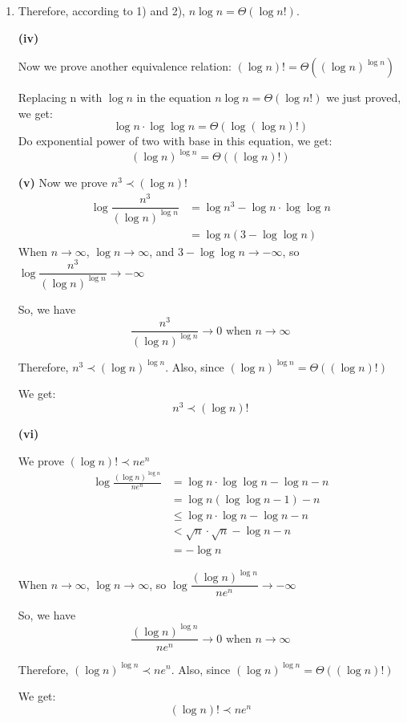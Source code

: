 \documentclass[12pt,a4paper]{article}
\makeatletter
\newtheorem*{solution}{Solution}
\theoremstyle{definition}
\renewenvironment{solution}[1][Solution] {\par\pushQED{\qed}\normalfont\topsep6\p@\@plus6\p@\relax\trivlist\item[\hskip\labelsep\bfseries#1\@addpunct{.}]\ignorespaces}{\popQED\endtrivlist\@endpefalse} \makeatother
\makeatother
\begin{document}
\begin{enumerate}
\begin{solution}
Therefore, according to 1) and 2), $n\log n = \Theta{(\log n!)}$.


\textbf{(iv)}

Now we prove another equivalence relation: $(\log n)  != \Theta((\log n)^{\log n})$

Replacing n with $\log n $ in the equation $n\log n = \Theta{(\log n!)}$ we just proved, we get:
$$
\log n \cdot \log \log n  = \Theta{(\log (\log n )!)}
$$
Do 	exponential power of two with base in this equation, we get:
$$
(\log n)^{\log n} = \Theta((\log n)! )
$$ 

\textbf{(v)}
Now we prove $n^3 \prec (\log n)!$
\begin{align*}
	\log\dfrac{n^3}{(\log n)^{\log n}} &= \log n^3  - \log n \cdot \log\log n\\
	&= \log n (3 - \log \log n)
\end{align*}
When $n \rightarrow \infty$, $\log n \rightarrow \infty$, and $3 - \log \log n \rightarrow -\infty$, so $	\log\dfrac{n^3}{(\log n)^{\log n} }\rightarrow -\infty$

So, we have $$\dfrac{n^3}{(\log n)^{\log n} }\rightarrow 0  \text{ when }  n \rightarrow \infty$$

Therefore, $n^3 \prec (\log n)^{\log n}$. Also, since $ (\log n)^{\log n} = \Theta((\log n)! )$

We get: $$n^3 \prec (\log n)!$$

\textbf{(vi)}

 We prove $ (\log n)! \prec ne^n$
\begin{align*}
\log \frac{(\log n)^{\log n}}{n e^n} &= \log n \cdot \log\log n - \log n -n\\
&= \log n (\log\log n -1) -n\\
&\leq \log n \cdot \log n - \log n -n\\
&< \sqrt{n} \cdot \sqrt{n} -\log n -n\\
&= -\log n 
\end{align*}

When $n \rightarrow \infty$, $\log n \rightarrow \infty$, so $\log \dfrac{(\log n)^{\log n}}{n e^n} \rightarrow -\infty$

So, we have $$ \frac{(\log n)^{\log n}}{n e^n} \rightarrow 0  \text{ when }  n \rightarrow \infty$$

Therefore, $ (\log n)^{\log n} \prec ne^n$. Also, since $ (\log n)^{\log n} = \Theta((\log n)! )$

We get: $$ (\log n)! \prec ne^n$$


\end{solution}

\end{enumerate}

\end{document}
